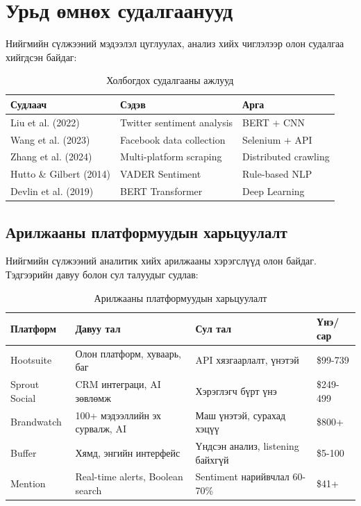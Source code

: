 \documentclass[12pt,a4paper]{report}
\begin{document}
\section{Урьд өмнөх судалгаанууд}

Нийгмийн сүлжээний мэдээлэл цуглуулах, анализ хийх чиглэлээр олон судалгаа хийгдсэн байдаг:

\begin{table}[H]
\centering
\caption{Холбогдох судалгааны ажлууд}
\begin{tabular}{|p{3cm}|p{4cm}|p{5cm}|}
\hline
\textbf{Судлаач} & \textbf{Сэдэв} & \textbf{Арга} \\
\hline
Liu et al. (2022) & Twitter sentiment analysis & BERT + CNN \\
\hline
Wang et al. (2023) & Facebook data collection & Selenium + API \\
\hline
Zhang et al. (2024) & Multi-platform scraping & Distributed crawling \\
\hline
Hutto \& Gilbert (2014) & VADER Sentiment & Rule-based NLP \\
\hline
Devlin et al. (2019) & BERT Transformer & Deep Learning \\
\hline
\end{tabular}
\end{table}

\subsection{Арилжааны платформуудын харьцуулалт}

Нийгмийн сүлжээний аналитик хийх арилжааны хэрэгслүүд олон байдаг. Тэдгээрийн давуу болон сул талуудыг судлав:

\begin{table}[H]
\centering
\caption{Арилжааны платформуудын харьцуулалт}
\begin{tabular}{|p{2.5cm}|p{4cm}|p{4cm}|p{2cm}|}
\hline
\textbf{Платформ} & \textbf{Давуу тал} & \textbf{Сул тал} & \textbf{Үнэ/сар} \\
\hline
Hootsuite & Олон платформ, хуваарь, баг & API хязгаарлалт, үнэтэй & \$99-739 \\
\hline
Sprout Social & CRM интеграци, AI зөвлөмж & Хэрэглэгч бүрт үнэ & \$249-499 \\
\hline
Brandwatch & 100+ мэдээллийн эх сурвалж, AI & Маш үнэтэй, сурахад хэцүү & \$800+ \\
\hline
Buffer & Хямд, энгийн интерфейс & Үндсэн анализ, listening байхгүй & \$5-100 \\
\hline
Mention & Real-time alerts, Boolean search & Sentiment нарийвчлал 60-70\% & \$41+ \\
\hline
\end{tabular}
\end{table}
\end{document}
